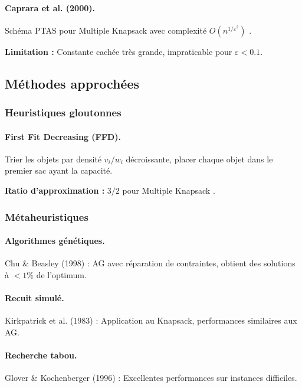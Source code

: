 \documentclass[12pt,a4paper]{article}
\theoremstyle{definition}
\theoremstyle{remark}
\begin{document}
\paragraph{Caprara et al. (2000).}
Schéma PTAS pour Multiple Knapsack avec complexité $O(n^{1/\varepsilon^2})$ \cite{caprara2000polynomial}.

\textbf{Limitation :} Constante cachée très grande, impraticable pour $\varepsilon < 0.1$.

\subsection{Méthodes approchées}

\subsubsection{Heuristiques gloutonnes}

\paragraph{First Fit Decreasing (FFD).}
Trier les objets par densité $v_i/w_i$ décroissante, placer chaque objet dans le premier sac ayant la capacité.

\textbf{Ratio d'approximation :} $3/2$ pour Multiple Knapsack \cite{johnson1974worst}.

\subsubsection{Métaheuristiques}

\paragraph{Algorithmes génétiques.}
Chu \& Beasley (1998) \cite{chu1998genetic} : AG avec réparation de contraintes, obtient des solutions à $< 1\%$ de l'optimum.

\paragraph{Recuit simulé.}
Kirkpatrick et al. (1983) \cite{kirkpatrick1983optimization} : Application au Knapsack, performances similaires aux AG.

\paragraph{Recherche tabou.}
Glover \& Kochenberger (1996) \cite{glover1996critical} : Excellentes performances sur instances difficiles.
\end{document}
